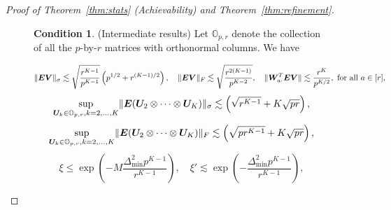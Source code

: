 \documentclass[journal]{IEEEtran}
\theoremstyle{definition}
\theoremstyle{definition}
\newtheorem{condition}{Condition}
\newcommand{\of}[1]{\left(#1\right)}
\newcounter{MYtempeqncnt}
\begin{document}
\begin{proof}[Proof of Theorem~\ref{thm:stats} (Achievability) and Theorem~\ref{thm:refinement}]
{\begin{figure}[t] 
\begin{condition}(Intermediate results) \label{cond:origin} Let $\mathbb{O}_{p, r}$ denote the collection of all the $p$-by-$r$ matrices with orthonormal columns. We have 
\setcounter{MYtempeqncnt}{\value{equation}} 

\setcounter{equation}{62} 
\begin{equation}\label{eq:cond1}
    \onormSize{}{\mE \mV}_\sigma \lesssim \sqrt{\frac{r^{K-1}}{p^{K-1}}} \of{ p ^{1/2}+ r^{(K-1)/2}}, \quad \onormSize{}{\mE \mV}_F \lesssim \sqrt{\frac{ r^{2(K-1)}}{p^{K-2}}},\quad \onormSize{}{ \mW_{a:}^T \mE \mV} \lesssim \frac{r^K}{p^{K/2}}, \text{  for all }a \in [r], 
\end{equation}
\begin{equation}\label{eq:cond2}
    \sup_{ \mU_k \in \mathbb{O}_{p, r}, k = 2,\ldots, K } \onormSize{}{ \mE (\mU_{2} \otimes \cdots \otimes \mU_K)}_\sigma \lesssim \of{ \sqrt{r^{K-1}} + K\sqrt{pr}},
\end{equation}
\begin{equation}\label{eq:cond3}
    \sup_{ \mU_k \in \mathbb{O}_{p, r}, k = 2,\ldots, K } \onormSize{}{ \mE (\mU_{2} \otimes \cdots \otimes \mU_K)}_F \lesssim \of{ \sqrt{pr^{K-1}} + K\sqrt{pr}},
\end{equation}
\begin{equation}\label{eq:cond_oracle}
    \xi \leq \exp\of{ - M \frac{\Delta_{\min}^2 p^{K-1}}{r^{K-1}}}, \quad  \xi' \lesssim \exp\of{ -  \frac{\Delta_{\min}^2 p^{K-1}}{r^{K-1}}},
\end{equation}


\end{condition}
\end{figure}}
\end{proof}
\end{document}
